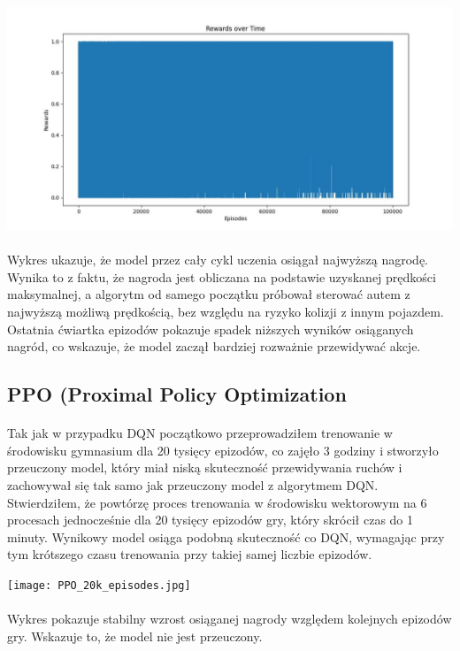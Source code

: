 \documentclass{article}
\begin{document}
\includegraphics[width=1\linewidth]{DQN+CNN.jpg}
\paragraph{}
Wykres ukazuje, że model przez cały cykl uczenia osiągał najwyższą nagrodę. Wynika to z faktu, że nagroda jest obliczana na podstawie uzyskanej prędkości maksymalnej, a algorytm od samego początku próbował sterować autem z najwyższą możliwą prędkością, bez względu na ryzyko kolizji z innym pojazdem. Ostatnia ćwiartka epizodów pokazuje spadek niższych wyników osiąganych nagród, co wskazuje, że model zaczął bardziej rozważnie przewidywać akcje.

\newpage

\subsection{PPO (Proximal Policy Optimization}
\paragraph{}
Tak jak w przypadku DQN początkowo przeprowadziłem trenowanie w środowisku gymnasium dla 20 tysięcy epizodów, co zajęło 3 godziny i stworzyło przeuczony model, który miał niską skuteczność przewidywania ruchów i zachowywał się tak samo jak przeuczony model z algorytmem DQN. Stwierdziłem, że powtórzę proces trenowania w środowisku wektorowym na 6 procesach jednocześnie dla 20 tysięcy epizodów gry, który skrócił czas do 1 minuty. Wynikowy model osiąga podobną skuteczność co DQN, wymagając przy tym krótszego czasu trenowania przy takiej samej liczbie epizodów.


\texttt{[image: PPO\_20k\_episodes.jpg]}

\paragraph{}
Wykres pokazuje stabilny wzrost osiąganej nagrody względem kolejnych epizodów gry. Wskazuje to, że model nie jest przeuczony.
\end{document}

